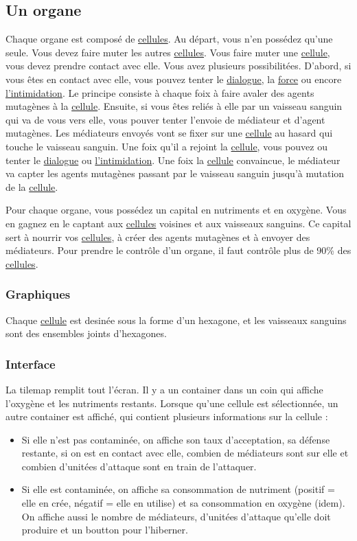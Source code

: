 \documentclass{article}
\begin{document}
\subsection{Un organe}\label{organe}
Chaque organe est composé de \hyperref[cellule]{cellules}. Au départ, vous n'en possédez qu'une seule. Vous devez faire muter les autres \hyperref[cellule]{cellules}. Vous faire muter une \hyperref[cellule]{cellule}, vous devez prendre contact avec elle. Vous avez plusieurs possibilitées. D'abord, si vous êtes en contact avec elle, vous pouvez tenter le \hyperref[dialogue]{dialogue}, la \hyperref[force]{force} ou encore \hyperref[intimi]{l'intimidation}. Le principe consiste à chaque foix à faire avaler des agents mutagènes à la \hyperref[cellule]{cellule}. Ensuite, si vous êtes reliés à elle par un vaisseau sanguin qui va de vous vers elle, vous pouver tenter l'envoie de médiateur et d'agent mutagènes. Les médiateurs envoyés vont se fixer sur une \hyperref[cellule]{cellule} au hasard qui touche le vaisseau sanguin. Une foix qu'il a rejoint la \hyperref[cellule]{cellule}, vous pouvez ou tenter le \hyperref[dialogue]{dialogue} ou \hyperref[intimi]{l'intimidation}. Une foix la \hyperref[cellule]{cellule} convaincue, le médiateur va capter les agents mutagènes passant par le vaisseau sanguin jusqu'à mutation de la \hyperref[cellule]{cellule}.

Pour chaque organe, vous possédez un capital en nutriments et en oxygène. Vous en gagnez en le captant aux \hyperref[cellule]{cellules} voisines et aux vaisseaux sanguins. Ce capital sert à nourrir vos \hyperref[cellule]{cellules}, à créer des agents mutagènes et à envoyer des médiateurs. Pour prendre le contrôle d'un organe, il faut contrôle plus de 90\% des \hyperref[cellule]{cellules}.

\subsubsection{Graphiques}
Chaque \hyperref[cellule]{cellule} est desinée sous la forme d'un hexagone, et les vaisseaux sanguins sont des ensembles joints d'hexagones.

\subsubsection{Interface}
La tilemap remplit tout l'écran. Il y a un container dans un coin qui affiche l'oxygène et les nutriments restants. Lorsque qu'une cellule est sélectionnée, un autre container est affiché, qui contient plusieurs informations sur la cellule :
\begin{itemize}
	\item Si elle n'est pas contaminée, on affiche son taux d'acceptation, sa défense restante, si on est en contact avec elle, combien de médiateurs sont sur elle et combien d'unitées d'attaque sont en train de l'attaquer.
	\item Si elle est contaminée, on affiche sa consommation de nutriment (positif = elle en crée, négatif = elle en utilise) et sa consommation en oxygène (idem). On affiche aussi le nombre de médiateurs, d'unitées d'attaque qu'elle doit produire et un boutton pour l'hiberner.
\end{itemize}
\end{document}
